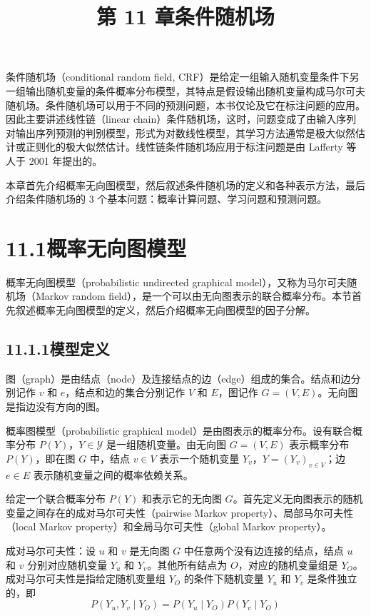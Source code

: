 \documentclass[UTF8,12pt,a4paper,fontset=fandol]{ctexart}
\title{第 11 章\quad 条件随机场}
\author{}
\date{}
\begin{document}
\maketitle

条件随机场（conditional random field, CRF）是给定一组输入随机变量条件下另一组输出随机变量的条件概率分布模型，其特点是假设输出随机变量构成马尔可夫随机场。条件随机场可以用于不同的预测问题，本书仅论及它在标注问题的应用。因此主要讲述线性链（linear chain）条件随机场，这时，问题变成了由输入序列对输出序列预测的判别模型，形式为对数线性模型，其学习方法通常是极大似然估计或正则化的极大似然估计。线性链条件随机场应用于标注问题是由 Lafferty 等人于 2001 年提出的。

本章首先介绍概率无向图模型，然后叙述条件随机场的定义和各种表示方法，最后介绍条件随机场的 3 个基本问题：概率计算问题、学习问题和预测问题。

\section*{11.1\quad 概率无向图模型}

概率无向图模型（probabilistic undirected graphical model），又称为马尔可夫随机场（Markov random field），是一个可以由无向图表示的联合概率分布。本节首先叙述概率无向图模型的定义，然后介绍概率无向图模型的因子分解。

\subsection*{11.1.1\quad 模型定义}

图（graph）是由结点（node）及连接结点的边（edge）组成的集合。结点和边分别记作 $v$ 和 $e$，结点和边的集合分别记作 $V$ 和 $E$，图记作 $G=(V,E)$。无向图是指边没有方向的图。

概率图模型（probabilistic graphical model）是由图表示的概率分布。设有联合概率分布 $P(Y)$，$Y\in\mathcal{Y}$ 是一组随机变量。由无向图 $G=(V,E)$ 表示概率分布 $P(Y)$，即在图 $G$ 中，结点 $v\in V$ 表示一个随机变量 $Y_v$，$Y=(Y_v)_{v\in V}$；边 $e\in E$ 表示随机变量之间的概率依赖关系。

给定一个联合概率分布 $P(Y)$ 和表示它的无向图 $G$。首先定义无向图表示的随机变量之间存在的成对马尔可夫性（pairwise Markov property）、局部马尔可夫性（local Markov property）和全局马尔可夫性（global Markov property）。

成对马尔可夫性：设 $u$ 和 $v$ 是无向图 $G$ 中任意两个没有边连接的结点，结点 $u$ 和 $v$ 分别对应随机变量 $Y_u$ 和 $Y_v$。其他所有结点为 $O$，对应的随机变量组是 $Y_O$。成对马尔可夫性是指给定随机变量组 $Y_O$ 的条件下随机变量 $Y_u$ 和 $Y_v$ 是条件独立的，即
\begin{equation}
P(Y_u,Y_v\mid Y_O)=P(Y_u\mid Y_O)P(Y_v\mid Y_O)
\tag{11.1}
\end{equation}
\end{document}
